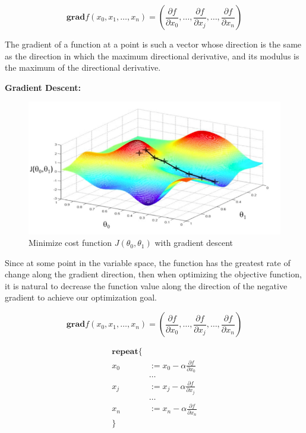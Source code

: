 \begin{equation*}
\mathbf{grad}f(x_0,x_1,\dots,x_n) = (\frac{\partial f}{\partial x_0},\dots,\frac{\partial f}{\partial x_j},\dots,\frac{\partial f}{\partial x_n})      
\end{equation*}

The gradient of a function at a point is such a vector whose direction is the same as the direction in which the maximum directional derivative, and its modulus is the maximum of the directional derivative.

\textbf{Gradient Descent:}\\

\begin{figure}[h]
\centering
\includegraphics[scale=0.5]{./fig/gradient_descent.png}
\caption{Minimize cost function $J(\theta_0,\theta_1)$ with gradient descent}
\label{fig:gradient_descent}
\end{figure}

Since at some point in the variable space, the function has the greatest rate of change along the gradient direction, then when optimizing the objective function, it is natural to decrease the function value along the direction of the negative gradient to achieve our optimization goal.

\begin{equation*}
\mathbf{grad}f(x_0,x_1,\dots,x_n) = (\frac{\partial f}{\partial x_0},\dots,\frac{\partial f}{\partial x_j},\dots,\frac{\partial f}{\partial x_n})      
\end{equation*}

\begin{align*}
\textbf{repeat\{}\\
x_0 &:= x_0 - \alpha\frac{\partial f}{\partial x_0} \\
& \dots  \\
x_j &:= x_j - \alpha\frac{\partial f}{\partial x_j} \\
& \dots  \\
x_n &:= x_n - \alpha\frac{\partial f}{\partial x_n} \\
\}
\end{align*}

